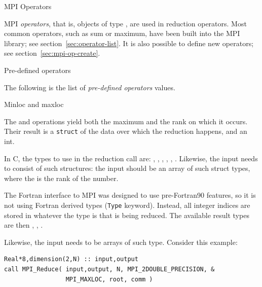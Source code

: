 
 {MPI Operators}
\label{sec:mpi-ops}

MPI \emph{operators},
that is, objects of type ,
are used in reduction operators.
Most common
operators, such as sum or maximum, have been built into the MPI
library; see section~\ref{sec:operator-list}.
It is also possible to define new operators; 
see section~\ref{sec:mpi-op-create}.

 {Pre-defined operators}
\label{sec:operator-list}

The following is the list of \emph{pre-defined operators}
 values.



 {Minloc and maxloc}

The  and  operations
yield both the maximum and the rank on which it occurs. Their result
is a \lstinline{struct} of the data over which the reduction happens,
and an int. 

In C, the types to use in the reduction call are:
,
,
,
,
,
.
Likewise, the input needs to consist of such structures:
the input should be an array of such struct types, where the  is
the rank of the number.

The Fortran interface to MPI was designed to use pre-Fortran90 features,
so it is not using Fortran derived types (\lstinline{Type} keyword).
Instead, all integer indices are stored in whatever the type is that is
being reduced. The available result types are then
,
,
.

Likewise, the input needs to be arrays of such type. Consider this example:
\lstset{language=Fortran}
\begin{lstlisting}
Real*8,dimension(2,N) :: input,output
call MPI_Reduce( input,output, N, MPI_2DOUBLE_PRECISION, &
                 MPI_MAXLOC, root, comm )
\end{lstlisting}
\lstset{language=C}

